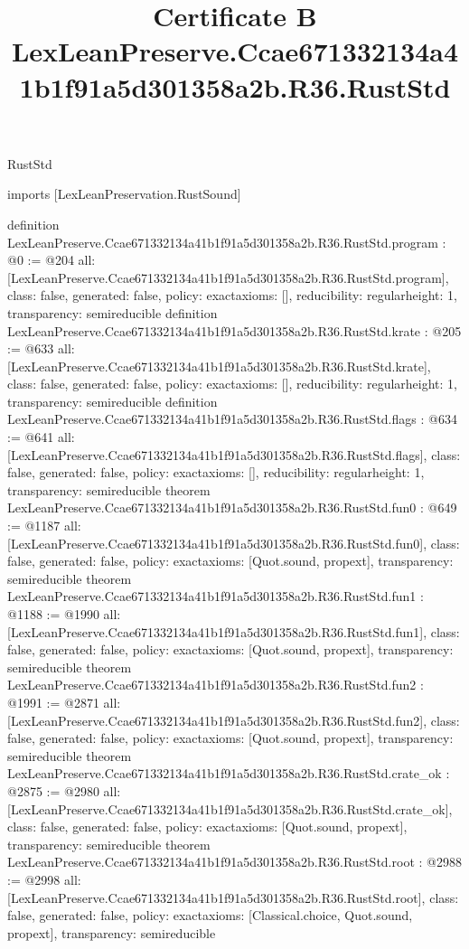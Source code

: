 \begin{lexlean}{RustStd}
\title{Certificate B LexLeanPreserve.Ccae671332134a41b1f91a5d301358a2b.R36.RustStd}
\begin{coremodule}
imports [LexLeanPreservation.RustSound]

definition LexLeanPreserve.Ccae671332134a41b1f91a5d301358a2b.R36.RustStd.program : @0 := @204 {
  all: [LexLeanPreserve.Ccae671332134a41b1f91a5d301358a2b.R36.RustStd.program],
  class: false,
  generated: false,
  policy: exact{axioms: []},
  reducibility: regular{height: 1},
  transparency: semireducible
}
definition LexLeanPreserve.Ccae671332134a41b1f91a5d301358a2b.R36.RustStd.krate : @205 := @633 {
  all: [LexLeanPreserve.Ccae671332134a41b1f91a5d301358a2b.R36.RustStd.krate],
  class: false,
  generated: false,
  policy: exact{axioms: []},
  reducibility: regular{height: 1},
  transparency: semireducible
}
definition LexLeanPreserve.Ccae671332134a41b1f91a5d301358a2b.R36.RustStd.flags : @634 := @641 {
  all: [LexLeanPreserve.Ccae671332134a41b1f91a5d301358a2b.R36.RustStd.flags],
  class: false,
  generated: false,
  policy: exact{axioms: []},
  reducibility: regular{height: 1},
  transparency: semireducible
}
theorem LexLeanPreserve.Ccae671332134a41b1f91a5d301358a2b.R36.RustStd.fun0 : @649 := @1187 {
  all: [LexLeanPreserve.Ccae671332134a41b1f91a5d301358a2b.R36.RustStd.fun0],
  class: false,
  generated: false,
  policy: exact{axioms: [Quot.sound, propext]},
  transparency: semireducible
}
theorem LexLeanPreserve.Ccae671332134a41b1f91a5d301358a2b.R36.RustStd.fun1 : @1188 := @1990 {
  all: [LexLeanPreserve.Ccae671332134a41b1f91a5d301358a2b.R36.RustStd.fun1],
  class: false,
  generated: false,
  policy: exact{axioms: [Quot.sound, propext]},
  transparency: semireducible
}
theorem LexLeanPreserve.Ccae671332134a41b1f91a5d301358a2b.R36.RustStd.fun2 : @1991 := @2871 {
  all: [LexLeanPreserve.Ccae671332134a41b1f91a5d301358a2b.R36.RustStd.fun2],
  class: false,
  generated: false,
  policy: exact{axioms: [Quot.sound, propext]},
  transparency: semireducible
}
theorem LexLeanPreserve.Ccae671332134a41b1f91a5d301358a2b.R36.RustStd.crate_ok : @2875 := @2980 {
  all: [LexLeanPreserve.Ccae671332134a41b1f91a5d301358a2b.R36.RustStd.crate_ok],
  class: false,
  generated: false,
  policy: exact{axioms: [Quot.sound, propext]},
  transparency: semireducible
}
theorem LexLeanPreserve.Ccae671332134a41b1f91a5d301358a2b.R36.RustStd.root : @2988 := @2998 {
  all: [LexLeanPreserve.Ccae671332134a41b1f91a5d301358a2b.R36.RustStd.root],
  class: false,
  generated: false,
  policy: exact{axioms: [Classical.choice, Quot.sound, propext]},
  transparency: semireducible
}


\end{coremodule}
\end{lexlean}
